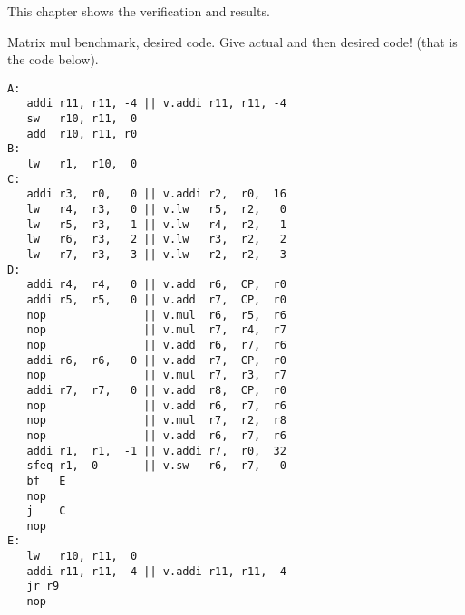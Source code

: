 
This chapter shows the verification and results.  


Matrix mul benchmark, desired code. Give actual and then desired code! (that is the code below).
\begin{lstlisting}
A:
   addi r11, r11, -4 || v.addi r11, r11, -4
   sw   r10, r11,  0
   add  r10, r11, r0
B:
   lw   r1,  r10,  0
C:
   addi r3,  r0,   0 || v.addi r2,  r0,  16
   lw   r4,  r3,   0 || v.lw   r5,  r2,   0
   lw   r5,  r3,   1 || v.lw   r4,  r2,   1
   lw   r6,  r3,   2 || v.lw   r3,  r2,   2
   lw   r7,  r3,   3 || v.lw   r2,  r2,   3
D:
   addi r4,  r4,   0 || v.add  r6,  CP,  r0
   addi r5,  r5,   0 || v.add  r7,  CP,  r0
   nop               || v.mul  r6,  r5,  r6
   nop               || v.mul  r7,  r4,  r7
   nop               || v.add  r6,  r7,  r6
   addi r6,  r6,   0 || v.add  r7,  CP,  r0
   nop               || v.mul  r7,  r3,  r7
   addi r7,  r7,   0 || v.add  r8,  CP,  r0
   nop               || v.add  r6,  r7,  r6
   nop               || v.mul  r7,  r2,  r8
   nop               || v.add  r6,  r7,  r6
   addi r1,  r1,  -1 || v.addi r7,  r0,  32
   sfeq r1,  0       || v.sw   r6,  r7,   0
   bf   E
   nop
   j    C  
   nop
E:
   lw   r10, r11,  0
   addi r11, r11,  4 || v.addi r11, r11,  4
   jr r9
   nop
\end{lstlisting}